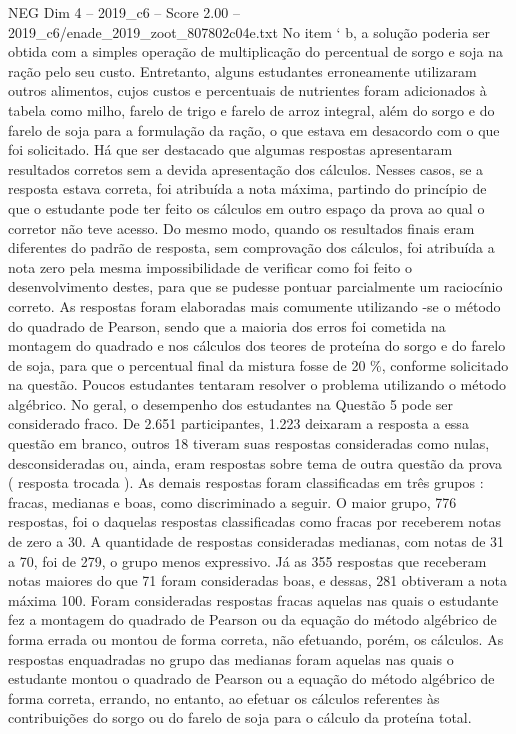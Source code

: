 \begin{textsample}{NEG Dim 4 – 2019\_c6 – Score 2.00 – 2019\_c6/enade\_2019\_zoot\_807802c04e.txt}
No item ‘ b, a solução poderia ser obtida com a simples operação de multiplicação do percentual de sorgo e soja na ração pelo seu custo.
Entretanto, alguns estudantes erroneamente utilizaram outros alimentos, cujos custos e percentuais de nutrientes foram adicionados à tabela como milho, farelo de trigo e farelo de arroz integral, além do sorgo e do farelo de soja para a formulação da ração, o que estava em desacordo com o que foi solicitado.
Há que ser destacado que algumas respostas apresentaram resultados corretos sem a devida apresentação dos cálculos.
Nesses casos, se a resposta estava correta, foi atribuída a nota máxima, partindo do princípio de que o estudante pode ter feito os cálculos em outro espaço da prova ao qual o corretor não teve acesso.
Do mesmo modo, quando os resultados finais eram diferentes do padrão de resposta, sem comprovação dos cálculos, foi atribuída a nota zero pela mesma impossibilidade de verificar como foi feito o desenvolvimento destes, para que se pudesse pontuar parcialmente um raciocínio correto.
As respostas foram elaboradas mais comumente utilizando -se o método do quadrado de Pearson, sendo que a maioria dos erros foi cometida na montagem do quadrado e nos cálculos dos teores de proteína do sorgo e do farelo de soja, para que o percentual final da mistura fosse de 20 \%, conforme solicitado na questão.
Poucos estudantes tentaram resolver o problema utilizando o método algébrico.
No geral, o desempenho dos estudantes na Questão 5 pode ser considerado fraco.
De 2.651 participantes, 1.223 deixaram a resposta a essa questão em branco, outros 18 tiveram suas respostas consideradas como nulas, desconsideradas ou, ainda, eram respostas sobre tema de outra questão da prova ( resposta trocada ).
As demais respostas foram classificadas em três grupos : fracas, medianas e boas, como discriminado a seguir.
O maior grupo, 776 respostas, foi o daquelas respostas classificadas como fracas por receberem notas de zero a 30.
A quantidade de respostas consideradas medianas, com notas de 31 a 70, foi de 279, o grupo menos expressivo.
Já as 355 respostas que receberam notas maiores do que 71 foram consideradas boas, e dessas, 281 obtiveram a nota máxima 100.
Foram consideradas respostas fracas aquelas nas quais o estudante fez a montagem do quadrado de Pearson ou da equação do método algébrico de forma errada ou montou de forma correta, não efetuando, porém, os cálculos.
As respostas enquadradas no grupo das medianas foram aquelas nas quais o estudante montou o quadrado de Pearson ou a equação do método algébrico de forma correta, errando, no entanto, ao efetuar os cálculos referentes às contribuições do sorgo ou do farelo de soja para o cálculo da proteína total.

\end{textsample}
